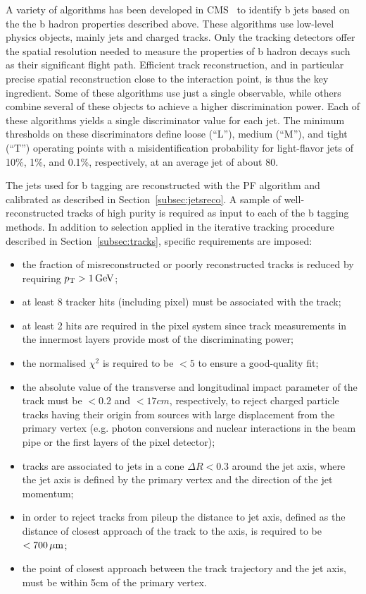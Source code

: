 A variety of algorithms has been developed in CMS~\cite{Chatrchyan:2012jua} to identify b jets based on the the b hadron properties described above. These algorithms use low-level physics objects, mainly jets and charged tracks. Only the tracking detectors offer the spatial resolution needed to measure the properties of b hadron decays such as their significant flight path. Efficient track reconstruction, and in particular precise spatial reconstruction close to the interaction point, is thus the key ingredient. 
Some of these algorithms use just a single observable, while others combine several of these objects to achieve a higher discrimination power. Each of these algorithms yields a single discriminator value for each jet. The minimum thresholds on these discriminators define loose (``L''), medium (``M''), and tight (``T'') operating points with a misidentification probability for light-flavor jets of 10\%, 1\%, and 0.1\%, respectively, at an average jet \pt of about 80\GeV.

The jets used for b tagging are reconstructed with the PF algorithm and calibrated as described in Section~\ref{subsec:jetsreco}. A sample of well-reconstructed tracks of high purity is required as input to each of the b tagging methods. In addition to selection applied in the iterative tracking procedure described in Section~\ref{subsec:tracks}, specific requirements are imposed:

\begin{itemize}
\item the fraction of misreconstructed or poorly reconstructed tracks is reduced by requiring $p_{\mathrm{T}} >1\,\text{Ge\hspace{-.08em}V}$;
\item at least 8 tracker hits (including pixel) must be associated with the track;
\item at least 2 hits are required in the pixel system since track measurements in the innermost layers provide most of the discriminating power;
\item the normalised $\chi^2$ is required to be $< 5$ to ensure a good-quality fit;
\item the absolute value of the transverse and longitudinal impact parameter of the track must be $< 0.2$ and $< 17\unit{cm}$, respectively, to reject charged particle tracks having their origin from sources with large displacement from the primary vertex (e.g. photon conversions and nuclear interactions in the beam pipe or the first layers of the pixel detector);
\item tracks are associated to jets in a cone $\Delta R < 0.3$ around the jet axis, where the jet axis is defined by the primary vertex and the direction of the jet momentum;
\item in order to reject tracks from pileup the distance to jet axis, defined as the distance of closest approach of the track to the axis, is required to be $< 700\,\mu\text{m}$;
\item the point of closest approach between the track trajectory and the jet axis, must be within 5\unit{cm} of the primary vertex.
\end{itemize}

